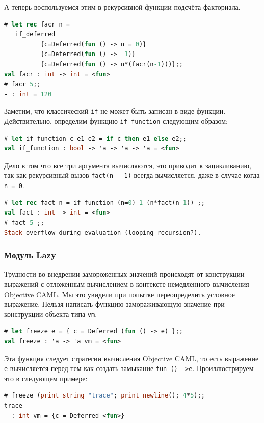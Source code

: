 А теперь воспользуемся этим в рекурсивной функции подсчёта факториала.

\begin{lstlisting}[language=OCaml]
# let rec facr n =
   if_deferred
          {c=Deferred(fun () -> n = 0)}
          {c=Deferred(fun () ->  1)}
          {c=Deferred(fun () -> n*(facr(n-1)))};;
val facr : int -> int = <fun>
# facr 5;;
- : int = 120
\end{lstlisting}

Заметим, что классический \texttt{if} не может быть записан в виде функции.
Действительно, определим функцию \texttt{if\_function} следующим образом:

\begin{lstlisting}[language=OCaml]
# let if_function c e1 e2 = if c then e1 else e2;;
val if_function : bool -> 'a -> 'a -> 'a = <fun>
\end{lstlisting}

Дело в том что все три аргумента вычисляются, это приводит к зацикливанию, так
как рекурсивный вызов \texttt{fact(n - 1)} всегда вычисляется, даже в случае
когда \texttt{n = 0}.

\begin{lstlisting}[language=OCaml]
# let rec fact n = if_function (n=0) 1 (n*fact(n-1)) ;;
val fact : int -> int = <fun>
# fact 5 ;;
Stack overflow during evaluation (looping recursion?).
\end{lstlisting}

\subsubsection{Модуль Lazy}

Трудности во внедрении замороженных значений происходят от конструкции выражений
с отложенным вычислением в контексте немедленного вычисления Objective CAML. Мы
это увидели при попытке переопределить условное выражение. Нельзя написать
функцию замораживающую значение при конструкции объекта типа \texttt{vm}.

\begin{lstlisting}[language=OCaml]
# let freeze e = { c = Deferred (fun () -> e) };;
val freeze : 'a -> 'a vm = <fun>
\end{lstlisting}

Эта функция следует стратегии вычисления Objective CAML, то есть выражение
\texttt{e} вычисляется перед тем как создать замыкание \texttt{fun () ->e}.
Проиллюстрируем это в следующем примере:

\begin{lstlisting}[language=OCaml]
# freeze (print_string "trace"; print_newline(); 4*5);;
trace
- : int vm = {c = Deferred <fun>}
\end{lstlisting}


